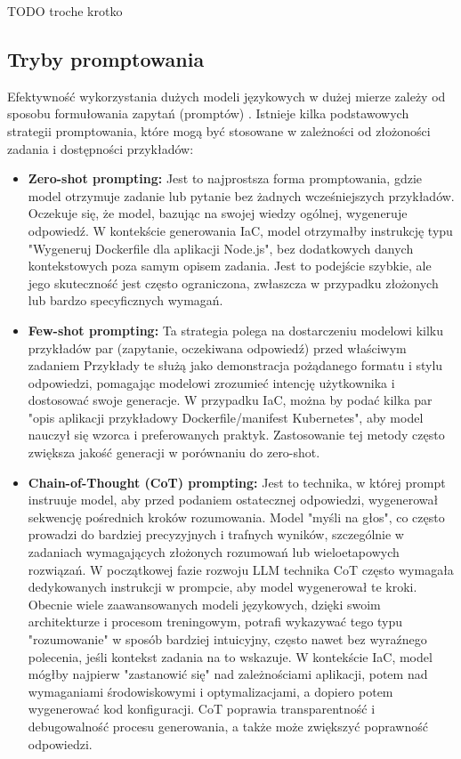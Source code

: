 TODO troche krotko

\subsection{Tryby promptowania}

Efektywność wykorzystania dużych modeli językowych w dużej mierze zależy od sposobu formułowania zapytań (promptów) \cite{kratzke_dont_2024}. Istnieje kilka podstawowych strategii promptowania, które mogą być stosowane w zależności od złożoności zadania i dostępności przykładów:

\begin{itemize}
	\item \textbf{Zero-shot prompting:} Jest to najprostsza forma promptowania, gdzie model otrzymuje zadanie lub pytanie bez żadnych wcześniejszych przykładów. Oczekuje się, że model, bazując na swojej wiedzy ogólnej, wygeneruje odpowiedź. W kontekście generowania IaC, model otrzymałby instrukcję typu "Wygeneruj Dockerfile dla aplikacji Node.js", bez dodatkowych danych kontekstowych poza samym opisem zadania. Jest to podejście szybkie, ale jego skuteczność jest często ograniczona, zwłaszcza w przypadku złożonych lub bardzo specyficznych wymagań.
	\item \textbf{Few-shot prompting:} Ta strategia polega na dostarczeniu modelowi kilku przykładów par (zapytanie, oczekiwana odpowiedź) przed właściwym zadaniem \cite{brown_language_2020} Przykłady te służą jako demonstracja pożądanego formatu i stylu odpowiedzi, pomagając modelowi zrozumieć intencję użytkownika i dostosować swoje generacje. W przypadku IaC, można by podać kilka par "opis aplikacji \textrightarrow{} przykładowy Dockerfile/manifest Kubernetes", aby model nauczył się wzorca i preferowanych praktyk. Zastosowanie tej metody często zwiększa jakość generacji w porównaniu do zero-shot.
	\item \textbf{Chain-of-Thought (CoT) prompting:} Jest to technika, w której prompt instruuje model, aby przed podaniem ostatecznej odpowiedzi, wygenerował sekwencję pośrednich kroków rozumowania. Model "myśli na głos", co często prowadzi do bardziej precyzyjnych i trafnych wyników, szczególnie w zadaniach wymagających złożonych rozumowań lub wieloetapowych rozwiązań. W początkowej fazie rozwoju LLM technika CoT często wymagała dedykowanych instrukcji w prompcie, aby model wygenerował te kroki. Obecnie wiele zaawansowanych modeli językowych, dzięki swoim architekturze i procesom treningowym, potrafi wykazywać tego typu "rozumowanie" w sposób bardziej intuicyjny, często nawet bez wyraźnego polecenia, jeśli kontekst zadania na to wskazuje. W kontekście IaC, model mógłby najpierw "zastanowić się" nad zależnościami aplikacji, potem nad wymaganiami środowiskowymi i optymalizacjami, a dopiero potem wygenerować kod konfiguracji. CoT poprawia transparentność i debugowalność procesu generowania, a także może zwiększyć poprawność odpowiedzi.

\end{itemize}
